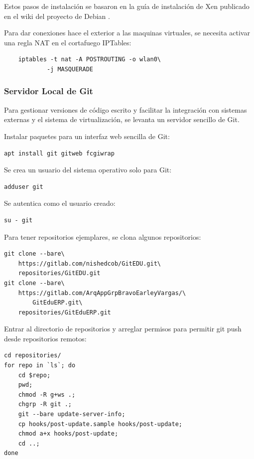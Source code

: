 Estos pasos de instalación se basaron en la guía de instalación de Xen publicado en el wiki del proyecto de Debian \citep{Debian-Wiki-Xen}.

Para dar conexiones hace el exterior a las maquinas virtuales, se necesita activar una regla NAT en el cortafuego IPTables:

\begin{lstlisting}
	iptables -t nat -A POSTROUTING -o wlan0\
    		-j MASQUERADE
\end{lstlisting}

 
\subsubsection{Servidor Local de Git}
Para gestionar versiones de código escrito y facilitar la integración con sistemas externas y el sistema de virtualización, se levanta un servidor sencillo de Git.

Instalar paquetes para un interfaz web sencilla de Git:
\begin{lstlisting}
apt install git gitweb fcgiwrap
\end{lstlisting}

Se crea un usuario del sistema operativo solo para Git:
\begin{lstlisting}
adduser git
\end{lstlisting}

Se autentica como el usuario creado:
\begin{lstlisting}
su - git
\end{lstlisting}

Para tener repositorios ejemplares, se clona algunos repositorios:
\begin{lstlisting}
git clone --bare\
	https://gitlab.com/nishedcob/GitEDU.git\
	repositories/GitEDU.git
git clone --bare\
	https://gitlab.com/ArqAppGrpBravoEarleyVargas/\
    	GitEduERP.git\
	repositories/GitEduERP.git
\end{lstlisting}

Entrar al directorio de repositorios y arreglar permisos para permitir git push desde repositorios remotos:
\begin{lstlisting}
cd repositories/
for repo in `ls`; do
	cd $repo;
    pwd;
    chmod -R g+ws .;
    chgrp -R git .;
    git --bare update-server-info;
    cp hooks/post-update.sample hooks/post-update;
    chmod a+x hooks/post-update;
    cd ..;
done
\end{lstlisting}

